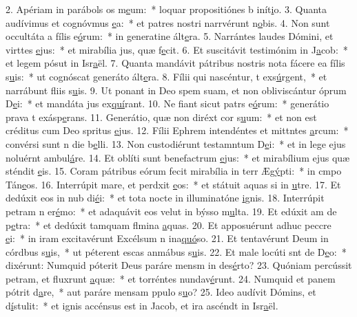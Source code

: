 2. Apériam in parábols os m\uline{e}um:~* loquar propositiónes b inít\uline{i}o.
3. Quanta audívimus et cognóvmus \uline{e}a:~* et patres nostri narrvérunt n\uline{o}bis.
4. Non sunt occultáta a fílis e\uline{ó}rum:~* in generatine ált\uline{e}ra.
5. Narrántes laudes Dómini, et virttes \uline{e}jus:~* et mirabília jus, quæ f\uline{e}cit.
6. Et suscitávit testimónim in J\uline{a}cob:~* et legem pósut in Isr\uline{a}ël.
7. Quanta mandávit pátribus nostris nota fácere ea fílis s\uline{u}is:~* ut cognóscat generáto ált\uline{e}ra.
8. Fílii qui nascéntur, t exs\uline{ú}rgent,~* et narrábunt fliis s\uline{u}is.
9. Ut ponant in Deo spem suam, et non obliviscántur óprum D\uline{e}i:~* et mandáta jus ex\uline{quí}rant.
10. Ne fiant sicut patrs e\uline{ó}rum:~* generátio prava t exásp\uline{e}rans.
11. Generátio, quæ non diréxt cor s\uline{u}um:~* et non est créditus cum Deo spritus \uline{e}jus.
12. Fílii Ephrem intendéntes et mittntes \uline{a}rcum:~* convérsi sunt n die b\uline{e}lli.
13. Non custodiérunt testamntum D\uline{e}i:~* et in lege ejus noluérnt ambul\uline{á}re.
14. Et oblíti sunt benefactrum \uline{e}jus:~* et mirabílium ejus quæ sténdit \uline{e}is.
15. Coram pátribus eórum fecit mirabília in terr Æg\uline{ý}pti:~* in cmpo Tán\uline{e}os.
16. Interrúpit mare, et perdxit \uline{e}os:~* et státuit aquas si in \uline{u}tre.
17. Et dedúxit eos in nub di\uline{é}i:~* et tota nocte in illuminatóne \uline{i}gnis.
18. Interrúpit petram n er\uline{é}mo:~* et adaquávit eos velut in býsso m\uline{u}lta.
19. Et edúxit am de p\uline{e}tra:~* et dedúxit tamquam flmina \uline{a}quas.
20. Et apposuérunt adhuc peccre \uline{e}i:~* in iram excitavérunt Excélsum n ina\uline{quó}so.
21. Et tentavérunt Deum in córdbus s\uline{u}is,~* ut péterent escas anmábus s\uline{u}is.
22. Et male locúti snt de D\uline{e}o:~* dixérunt: Numquid póterit Deus paráre mensm in des\uline{é}rto?
23. Quóniam percússit petram, et fluxrunt \uline{a}quæ:~* et torréntes nundav\uline{é}runt.
24. Numquid et panem pótrit d\uline{a}re,~* aut paráre mensam ppulo s\uline{u}o?
25. Ideo audívit Dómins, et d\uline{í}stulit:~* et ignis accénsus est in Jacob, et ira ascéndt in Isr\uline{a}ël.
